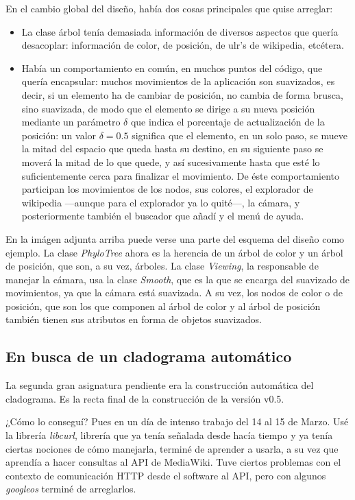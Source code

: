 En el cambio global del diseño, había dos cosas principales que quise
arreglar:
\begin{itemize}
\item La clase árbol tenía demasiada información de diversos aspectos
  que quería desacoplar: información de color, de posición, de ulr's
  de wikipedia, etcétera.
\item Había un comportamiento en común, en muchos puntos del código,
  que quería encapsular: muchos movimientos de la aplicación son
  suavizados, es decir, si un elemento ha de cambiar de posición, no
  cambia de forma brusca, sino suavizada, de modo que el elemento se
  dirige a su nueva posición mediante un parámetro $\delta$ que indica
  el porcentaje de actualización de la posición: un valor $\delta=0.5$
  significa que el elemento, en un solo paso, se mueve la mitad del
  espacio que queda hasta su destino, en su siguiente paso se moverá
  la mitad de lo que quede, y así sucesivamente hasta que esté lo
  suficientemente cerca para finalizar el movimiento. De éste
  comportamiento participan los movimientos de los nodos, sus colores, el
  explorador de wikipedia \----aunque para el explorador ya lo
  quité\----, la cámara, y posteriormente también el buscador que
  añadí y el menú de ayuda.
\end{itemize}

En la imágen adjunta arriba puede verse una parte del esquema del
diseño como ejemplo. La clase \textit{PhyloTree} ahora es la herencia
de un árbol de color y un árbol de posición, que son, a su vez,
árboles. La clase \textit{Viewing}, la responsable de
manejar la cámara, usa la clase \textit{Smooth}, que es la que se
encarga del suavizado de movimientos, ya que la cámara está
suavizada. A su vez, los nodos de color o de posición, que son los que
componen al árbol de color y al árbol de posición también tienen sus
atributos en forma de objetos suavizados.

\subsection{En busca de un cladograma automático}
La segunda gran asignatura pendiente era la construcción automática
del cladograma. Es la recta final de la construcción de la versión
v0.5.

¿Cómo lo conseguí? Pues en un día de intenso trabajo del 14 al 15 de
Marzo. Usé la librería \textit{libcurl}, librería que ya tenía
señalada desde hacía tiempo y ya tenía ciertas nociones de cómo
manejarla, terminé de aprender a usarla, a su vez que aprendía a hacer
consultas al API de MediaWiki. Tuve ciertos problemas con el contexto
de comunicación HTTP desde el software al API, pero con algunos
\textit{googleos} terminé de arreglarlos.

